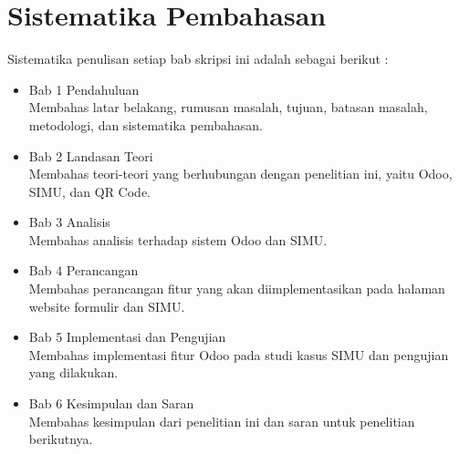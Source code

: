 \section{Sistematika Pembahasan}
\label{sec:sispem}
Sistematika penulisan setiap bab skripsi ini adalah sebagai berikut :
\begin{itemize}
	\item Bab 1 Pendahuluan \\
	Membahas latar belakang, rumusan masalah, tujuan, batasan masalah, metodologi, dan sistematika pembahasan.
	\item Bab 2 Landasan Teori \\
	Membahas teori-teori yang berhubungan dengan penelitian ini, yaitu Odoo, SIMU, dan QR Code.
	\item Bab 3 Analisis \\
	Membahas analisis terhadap sistem Odoo dan SIMU.
	\item Bab 4 Perancangan \\
	Membahas perancangan fitur yang akan diimplementasikan pada halaman website formulir dan SIMU.
	\item Bab 5 Implementasi dan Pengujian \\
	Membahas implementasi fitur Odoo pada studi kasus SIMU dan pengujian yang dilakukan.
	\item Bab 6 Kesimpulan dan Saran \\
	Membahas kesimpulan dari penelitian ini dan saran untuk penelitian berikutnya.
\end{itemize}
